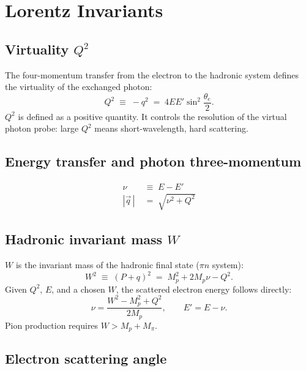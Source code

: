 \documentclass[12pt,a4paper]{article}
\begin{document}
\section{Lorentz Invariants}

\subsection{Virtuality \texorpdfstring{$Q^2$}{Q2}}

The four-momentum transfer from the electron to the hadronic system defines
the virtuality of the exchanged photon:
\begin{equation}
  Q^2 \;\equiv\; -q^2 \;=\; 4 E E' \sin^2\!\frac{\theta_e}{2}.
  \label{eq:Q2}
\end{equation}
$Q^2$ is defined as a positive quantity. It controls the resolution of the
virtual photon probe: large $Q^2$ means short-wavelength, hard scattering.

\subsection{Energy transfer and photon three-momentum}

\begin{align}
  \nu &\;\equiv\; E - E' \label{eq:nu}\\[4pt]
  |\vec{q}\,| &\;=\; \sqrt{\nu^2 + Q^2} \label{eq:qmag}
\end{align}

\subsection{Hadronic invariant mass \texorpdfstring{$W$}{W}}

$W$ is the invariant mass of the hadronic final state ($\pi n$ system):
\begin{equation}
  W^2 \;\equiv\; (P + q)^2 \;=\; M_p^2 + 2 M_p \nu - Q^2.
  \label{eq:W2}
\end{equation}
Given $Q^2$, $E$, and a chosen $W$, the scattered electron energy follows
directly:
\begin{equation}
  \nu = \frac{W^2 - M_p^2 + Q^2}{2 M_p},
  \qquad
  E' = E - \nu.
  \label{eq:Eprime}
\end{equation}
Pion production requires $W > M_p + M_\pi$.

\subsection{Electron scattering angle}
\end{document}
